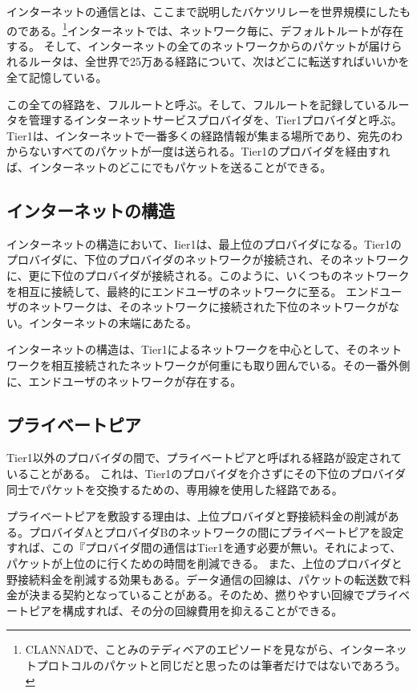 インターネットの通信とは、ここまで説明したバケツリレーを世界規模にしたものである。\footnote{CLANNADで、ことみのテディベアのエピソードを見ながら、インターネットプロトコルのパケットと同じだと思ったのは筆者だけではないであろう。}インターネットでは、ネットワーク毎に、デフォルトルートが存在する。
そして、インターネットの全てのネットワークからのパケットが届けられるルータは、全世界で25万ある経路について、次はどこに転送すればいいかを全て記憶している。

この全ての経路を、フルルートと呼ぶ。そして、フルルートを記録しているルータを管理するインターネットサービスプロバイダを、Tier1プロバイダと呼ぶ。
Tier1は、インターネットで一番多くの経路情報が集まる場所であり、宛先のわからないすべてのパケットが一度は送られる。Tier1のプロバイダを経由すれば、インターネットのどこにでもパケットを送ることができる。

\subsection{インターネットの構造}

インターネットの構造において、Iier1は、最上位のプロバイダになる。Tier1のプロバイダに、下位のプロバイダのネットワークが接続され、そのネットワークに、更に下位のプロバイダが接続される。このように、いくつものネットワークを相互に接続して、最終的にエンドユーザのネットワークに至る。
エンドユーザのネットワークは、そのネットワークに接続された下位のネットワークがない。インターネットの末端にあたる。

インターネットの構造は、Tier1によるネットワークを中心として、そのネットワークを相互接続されたネットワークが何重にも取り囲んでいる。その一番外側に、エンドユーザのネットワークが存在する。

\subsection{プライベートピア}

Tier1以外のプロバイダの間で、プライベートピアと呼ばれる経路が設定されていることがある。
これは、Tier1のプロバイダを介さずにその下位のプロバイダ同士でパケットを交換するための、専用線を使用した経路である。

プライベートピアを敷設する理由は、上位プロバイダと野接続料金の削減がある。プロバイダAとプロバイダBのネットワークの間にプライベートピアを設定すれば、この『プロバイダ間の通信はTier1を通す必要が無い。それによって、パケットが上位のに行くための時間を削減できる。
また、上位のプロバイダと野接続料金を削減する効果もある。データ通信の回線は、パケットの転送数で料金が決まる契約となっていることがある。そのため、撚りやすい回線でプライベートピアを構成すれば、その分の回線費用を抑えることができる。



